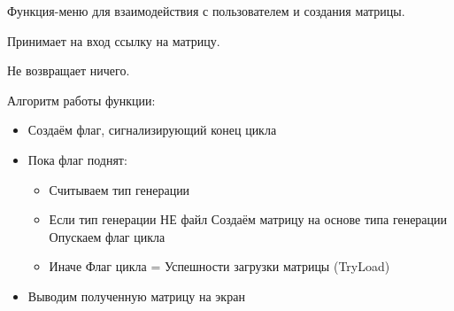 Функция-меню для взаимодействия с пользователем и создания матрицы.

Принимает на вход ссылку на матрицу.

Не возвращает ничего.

Алгоритм работы функции:

\begin{itemize}
	\item Создаём флаг, сигнализирующий конец цикла
	\item Пока флаг поднят:
	\begin{itemize}
		  \item Считываем тип генерации
		  \item Если тип генерации НЕ файл
		  \subitem Создаём матрицу на основе типа генерации
		  \subitem Опускаем флаг цикла
		  \item Иначе
		  \subitem Флаг цикла = Успешности загрузки матрицы (TryLoad)
	\end{itemize}
	\item Выводим полученную матрицу на экран
\end{itemize}